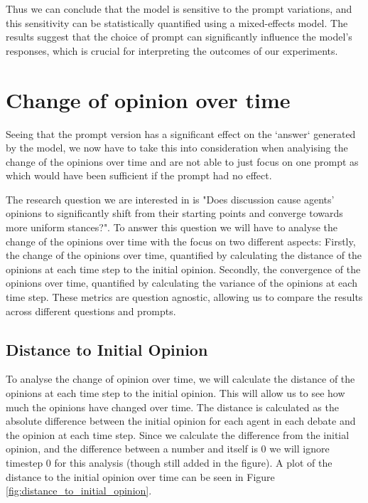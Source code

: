 \documentclass[12pt]{article}
\begin{document}
Thus we can conclude that the model is sensitive to the prompt variations, and this sensitivity can be statistically quantified using a mixed-effects model. The results suggest that the choice of prompt can significantly influence the model's responses, which is crucial for interpreting the outcomes of our experiments.


\section{Change of opinion over time}
Seeing that the prompt version has a significant effect on the `answer` generated by the model, we now have to take this into consideration when analyising the change of the opinions over time and are not able to just focus on one prompt as which would have been sufficient if the prompt had no effect.

The research question we are interested in is "Does discussion cause agents' opinions to significantly shift from their starting points and converge towards more uniform stances?". To answer this question we will have to analyse the change of the opinions over time with the focus on two different aspects: Firstly, the change of the opinions over time, quantified by calculating the distance of the opinions at each time step to the initial opinion. Secondly, the convergence of the opinions over time, quantified by calculating the variance of the opinions at each time step. These metrics are question agnostic, allowing us to compare the results across different questions and prompts.

\subsection{Distance to Initial Opinion}

To analyse the change of opinion over time, we will calculate the distance of the opinions at each time step to the initial opinion. This will allow us to see how much the opinions have changed over time. The distance is calculated as the absolute difference between the initial opinion for each agent in each debate and the opinion at each time step. Since we calculate the difference from the initial opinion, and the difference between a number and itself is 0 we will ignore timestep 0 for this analysis (though still added in the figure). A plot of the distance to the initial opinion over time can be seen in Figure \ref{fig:distance_to_initial_opinion}.
\end{document}
